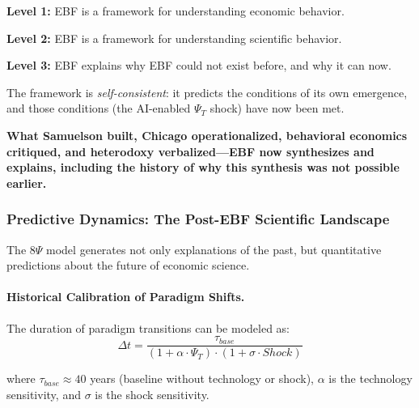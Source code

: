 \begin{tcolorbox}[colback=green!5!white, colframe=green!75!black,
    title=\textbf{The Meta-Synthesis}]

\textbf{Level 1:} EBF is a framework for understanding economic behavior.

\textbf{Level 2:} EBF is a framework for understanding scientific behavior.

\textbf{Level 3:} EBF explains why EBF could not exist before, and why it can now.

The framework is \textit{self-consistent}: it predicts the conditions of its
own emergence, and those conditions (the AI-enabled $\Psi_T$ shock) have
now been met.

\textbf{What Samuelson built, Chicago operationalized, behavioral economics
critiqued, and heterodoxy verbalized---EBF now synthesizes and explains,
including the history of why this synthesis was not possible earlier.}

\end{tcolorbox}


\subsubsection{Predictive Dynamics: The Post-EBF Scientific Landscape}

The 8$\Psi$ model generates not only explanations of the past, but quantitative
predictions about the future of economic science.

\paragraph{Historical Calibration of Paradigm Shifts.}

The duration of paradigm transitions can be modeled as:
\begin{equation}
\Delta t = \frac{\tau_{base}}{(1 + \alpha \cdot \Psi_T) \cdot (1 + \sigma \cdot Shock)}
\end{equation}

where $\tau_{base} \approx 40$ years (baseline without technology or shock),
$\alpha$ is the technology sensitivity, and $\sigma$ is the shock sensitivity.

